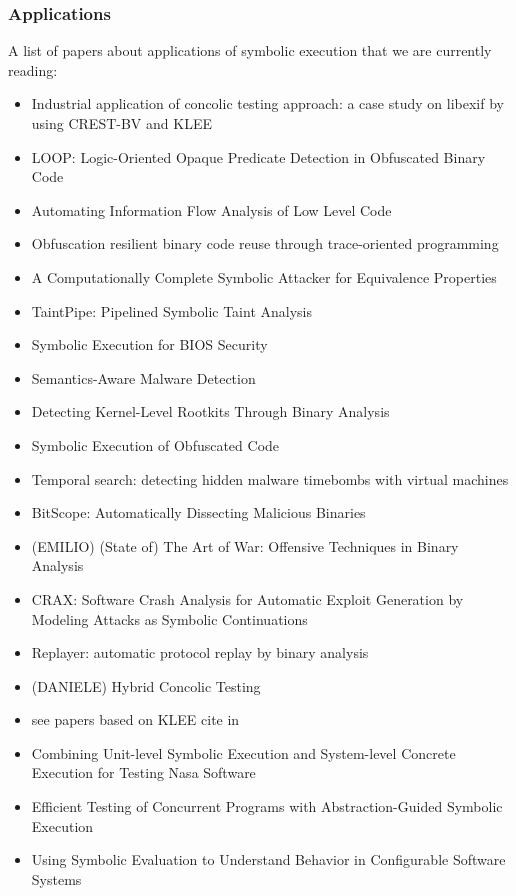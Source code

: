 \documentclass[10pt, a4paper]{article}
\begin{document}
\subsubsection{Applications}
A list of papers about applications of symbolic execution that we are currently reading:
\begin{itemize}
  \item \cite{KKK-ICSE12} Industrial application of concolic testing approach: a case study on libexif by using CREST-BV and KLEE
  \item \cite{LOOP-CCS15} LOOP: Logic-Oriented Opaque Predicate Detection in Obfuscated Binary Code
  \item \cite{BDG-CCS14} Automating Information Flow Analysis of Low Level Code
  \item \cite{ZFM-CCS13} Obfuscation resilient binary code reuse through trace-oriented programming
  \item \cite{BC-CCS14} A Computationally Complete Symbolic Attacker for Equivalence Properties
  \item \cite{MWX-USEC15} TaintPipe: Pipelined Symbolic Taint Analysis
  \item \cite{BLR-WOOT15} Symbolic Execution for {BIOS} Security
  \item \cite{CJS-SP05} Semantics-Aware Malware Detection
  \item \cite{KRV-ACSAC04} Detecting Kernel-Level Rootkits Through Binary Analysis
  \item \cite{YD-CCS15} Symbolic Execution of Obfuscated Code
  \item \cite{CWO-ASPLOS06} Temporal search: detecting hidden malware timebombs with virtual machines
  \item \cite{BHK-TR07} BitScope: Automatically Dissecting Malicious Binaries
  \item (EMILIO) \cite{ANGR-SP16} (State of) The Art of War: Offensive Techniques in Binary Analysis
  \item \cite{CRAX-SERE12} CRAX: Software Crash Analysis for Automatic Exploit Generation by Modeling Attacks as Symbolic Continuations
  \item \cite{REPLAYER-CCS06} Replayer: automatic protocol replay by binary analysis
  \item (DANIELE) \cite{RK-ICSE07} Hybrid Concolic Testing
  \item see papers based on KLEE cite in~\cite{RED-ICSE16} 
  \item \cite{PMB-ISSTA08} Combining Unit-level Symbolic Execution and System-level Concrete Execution for Testing Nasa Software
  \item \cite{RMV-SPIN09} Efficient Testing of Concurrent Programs with Abstraction-Guided Symbolic Execution
  \item \cite{RSM-ICSE10} Using Symbolic Evaluation to Understand Behavior in Configurable Software Systems
  \end{itemize}


\end{document}
